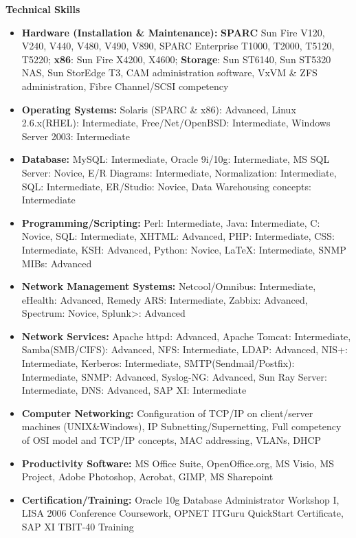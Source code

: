 \documentclass[10pt,oneside]{article}
\newenvironment{ressection}[1]{
	\vspace{4pt}
	\textbf{\selectfont\normalsize#1}
	\begin{itemize}
	\vspace{3pt}
}{
	\end{itemize}
}
\newcommand{\resitem}[1]{
	\vspace{-4pt}
	\item \begin{flushleft} #1 \end{flushleft}
}
\begin{document}
\begin{ressection}{Technical Skills}

	\resitem{\textbf{Hardware (Installation \& Maintenance):} \textbf{SPARC} Sun Fire V120, V240, V440, V480, V490, V890, SPARC Enterprise T1000, T2000, T5120, T5220; \textbf{x86}: Sun Fire X4200, X4600; \textbf{Storage}: Sun ST6140, Sun ST5320 NAS, Sun StorEdge T3, CAM administration software, VxVM \& ZFS administration, Fibre Channel/SCSI competency}

	\resitem{\textbf{Operating Systems:} Solaris (SPARC \& x86): Advanced, Linux 2.6.x(RHEL): Intermediate, Free/Net/OpenBSD: Intermediate, Windows Server 2003: Intermediate}

	\resitem{\textbf{Database:} MySQL: Intermediate, Oracle 9i/10g: Intermediate, MS SQL Server: Novice, E/R Diagrams: Intermediate, Normalization: Intermediate, SQL: Intermediate, ER/Studio: Novice, Data Warehousing concepts: Intermediate}

	\resitem{\textbf{Programming/Scripting:} Perl: Intermediate, Java: Intermediate, C: Novice, SQL: Intermediate, XHTML: Advanced, PHP: Intermediate, CSS: Intermediate, KSH: Advanced, Python: Novice, \LaTeX: Intermediate, SNMP MIBs: Advanced}

	\resitem{\textbf{Network Management Systems:} Netcool/Omnibus: Intermediate, eHealth: Advanced, Remedy ARS: Intermediate, Zabbix: Advanced, Spectrum: Novice, Splunk>: Advanced}

	\resitem{\textbf{Network Services:} Apache httpd: Advanced, Apache Tomcat: Intermediate, Samba(SMB/CIFS): Advanced, NFS: Intermediate, LDAP: Advanced, NIS+: Intermediate, Kerberos: Intermediate, SMTP(Sendmail/Postfix): Intermediate, SNMP: Advanced, Syslog-NG: Advanced, Sun Ray Server: Intermediate, DNS: Advanced, SAP XI: Intermediate}

	\resitem{\textbf{Computer Networking:} Configuration of TCP/IP on client/server machines (UNIX\&Windows), IP Subnetting/Supernetting, Full competency of OSI model and TCP/IP concepts, MAC addressing, VLANs, DHCP}

	\resitem{\textbf{Productivity Software:} MS Office Suite, OpenOffice.org, MS Visio, MS Project, Adobe Photoshop, Acrobat, GIMP, MS Sharepoint}

	\resitem{\textbf{Certification/Training:} Oracle 10g Database Administrator Workshop I, LISA 2006 Conference Coursework, OPNET ITGuru QuickStart Certificate, SAP XI TBIT-40 Training}
	
\end{ressection}
\end{document}
